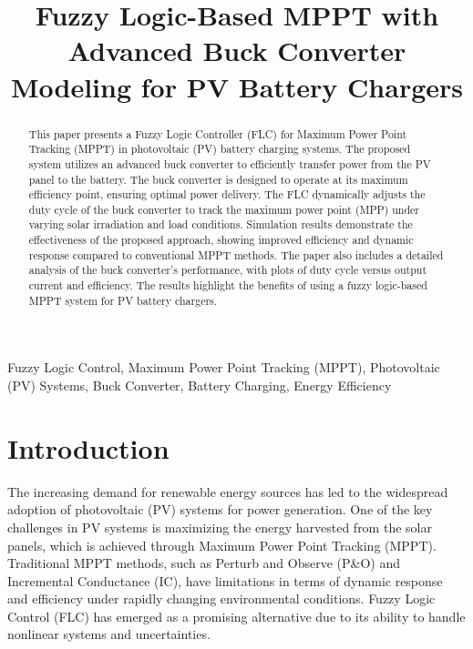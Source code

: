 \documentclass[conference]{IEEEtran}
\title{Fuzzy Logic-Based MPPT with Advanced Buck Converter Modeling for PV Battery Chargers}
\begin{document}
\author{
}

\maketitle

\begin{abstract}
This paper presents a Fuzzy Logic Controller (FLC) for Maximum Power Point Tracking (MPPT) in photovoltaic (PV) battery charging systems. The proposed system utilizes an advanced buck converter to efficiently transfer power from the PV panel to the battery. The buck converter is designed to operate at its maximum efficiency point, ensuring optimal power delivery. The FLC dynamically adjusts the duty cycle of the buck converter to track the maximum power point (MPP) under varying solar irradiation and load conditions. Simulation results demonstrate the effectiveness of the proposed approach, showing improved efficiency and dynamic response compared to conventional MPPT methods. The paper also includes a detailed analysis of the buck converter's performance, with plots of duty cycle versus output current and efficiency. The results highlight the benefits of using a fuzzy logic-based MPPT system for PV battery chargers.
\end{abstract}

\begin{IEEEkeywords}
Fuzzy Logic Control, Maximum Power Point Tracking (MPPT), Photovoltaic (PV) Systems, Buck Converter, Battery Charging, Energy Efficiency
\end{IEEEkeywords}

\section{Introduction}
The increasing demand for renewable energy sources has led to the widespread adoption of photovoltaic (PV) systems for power generation. One of the key challenges in PV systems is maximizing the energy harvested from the solar panels, which is achieved through Maximum Power Point Tracking (MPPT). Traditional MPPT methods, such as Perturb and Observe (P\&O) and Incremental Conductance (IC), have limitations in terms of dynamic response and efficiency under rapidly changing environmental conditions. Fuzzy Logic Control (FLC) has emerged as a promising alternative due to its ability to handle nonlinear systems and uncertainties.
\end{document}
